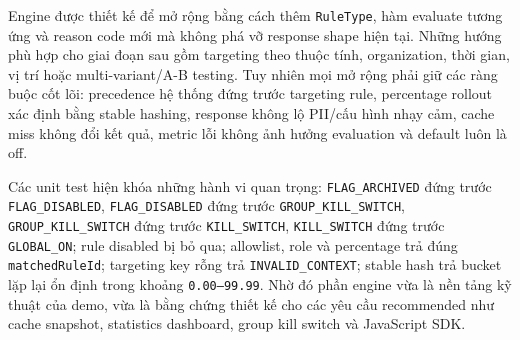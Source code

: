Engine được thiết kế để mở rộng bằng cách thêm \texttt{RuleType}, hàm evaluate tương ứng và reason code mới mà không phá vỡ response shape hiện tại. Những hướng phù hợp cho giai đoạn sau gồm targeting theo thuộc tính, organization, thời gian, vị trí hoặc multi-variant/A-B testing. Tuy nhiên mọi mở rộng phải giữ các ràng buộc cốt lõi: precedence hệ thống đứng trước targeting rule, percentage rollout xác định bằng stable hashing, response không lộ PII/cấu hình nhạy cảm, cache miss không đổi kết quả, metric lỗi không ảnh hưởng evaluation và default luôn là off.

Các unit test hiện khóa những hành vi quan trọng: \texttt{FLAG\_ARCHIVED} đứng trước \texttt{FLAG\_DISABLED}, \texttt{FLAG\_DISABLED} đứng trước \texttt{GROUP\_KILL\_SWITCH}, \texttt{GROUP\_KILL\_SWITCH} đứng trước \texttt{KILL\_SWITCH}, \texttt{KILL\_SWITCH} đứng trước \texttt{GLOBAL\_ON}; rule disabled bị bỏ qua; allowlist, role và percentage trả đúng \texttt{matchedRuleId}; targeting key rỗng trả \texttt{INVALID\_CONTEXT}; stable hash trả bucket lặp lại ổn định trong khoảng \texttt{0.00--99.99}. Nhờ đó phần engine vừa là nền tảng kỹ thuật của demo, vừa là bằng chứng thiết kế cho các yêu cầu recommended như cache snapshot, statistics dashboard, group kill switch và JavaScript SDK.
